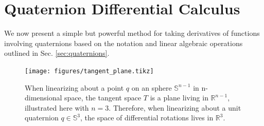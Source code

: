 \documentclass{svproc}
\newcommand{\R}{\mathbb{R}}
\newcommand{\Q}{\mathbb{S}^3}
\newcommand{\todo}[1]{\textcolor{red}{TODO: #1}}
\begin{document}
        
        
        

\section{Quaternion Differential Calculus} \label{sec:Quaternion_Calculus}
    We now present a simple but powerful method for taking derivatives of functions involving quaternions based on the notation and linear algebraic operations outlined in Sec. \ref{sec:quaternions}.
    
    \begin{figure}
        \centering
        \texttt{[image: figures/tangent\_plane.tikz]}
        \caption{When linearizing about a point $q$ on an sphere $\mathbb{S}^{n-1}$ in n-dimensional space, the tangent space $T$ is a plane living in $\R^{n-1}$, illustrated here with $n=3$. Therefore, when linearizing about a unit quaternion $q \in \Q$, the space of differential rotations lives in $\R^3$.}
        \label{fig:tangent_plane}
    \end{figure}
        
\end{document}
